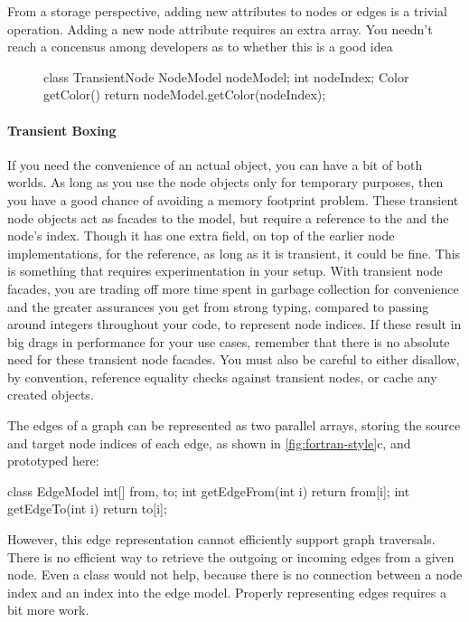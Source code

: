 From a storage perspective, adding new attributes to nodes or edges is a trivial
operation. Adding a new node attribute requires an extra array. You needn't
reach a concensus among developers as to whether this is a good idea




\begin{figure}
\centering
\begin{framedlisting}
class TransientNode {
  NodeModel nodeModel;
  int nodeIndex;
  Color getColor() {
    return nodeModel.getColor(nodeIndex);
  }
}
\end{framedlisting}
\end{figure}
\paragraph{Transient Boxing}
If you need the convenience of an actual  object, you can have a bit
of both worlds. As long as you use the node objects only for temporary purposes,
then you have a good chance of avoiding a memory footprint problem. These
transient node objects act as facades to the  model, but require a
reference to the  and the node's index.
Though it has one extra field, on top of the earlier node implementations, for
the  reference, as long as it is transient, it could be fine.
This is something that requires experimentation in your setup. With transient
node facades, you are trading off more time spent in garbage collection for
convenience and the greater assurances you get from strong typing, compared to
passing around integers throughout your code, to represent node indices.
If these result in big drags in performance for your use cases, remember
that there is no absolute need for these transient node facades. You must also
be careful to either disallow, by convention, reference equality checks against
transient nodes, or cache any created objects.

The edges of a graph can be represented as two parallel arrays, storing the
source and target node indices of each edge, as shown in
\autoref{fig:fortran-style}c, and prototyped here:
\begin{shortlisting}
class EdgeModel {
   int[] from, to;
   int getEdgeFrom(int i) {
      return from[i];
   }
   int getEdgeTo(int i) {
      return to[i];
   }
}
\end{shortlisting}
However, this edge representation cannot efficiently support graph
traversals. There is no efficient way to retrieve the outgoing or
incoming edges from a given node. Even a  class would not
help, because there is no connection between a node index and an index
into the edge model. Properly representing edges requires a bit more work. 

